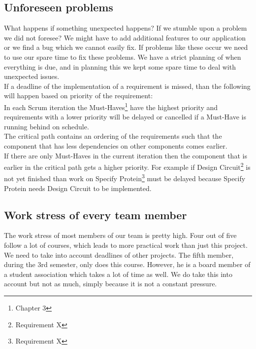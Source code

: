 \documentclass[a4paper]{article}
\begin{document}
\subsection{Unforeseen problems}
What happens if something unexpected happens? If we stumble upon a problem we did not foresee? We might have to add additional features to our application or we find a bug which we cannot easily fix. If problems like these occur we need to use our spare time to fix these problems. We have a strict planning of when everything is due, and in planning this we kept some spare time to deal with unexpected issues.\\
If a deadline of the implementation of a requirement is missed, than the following will happen based on priority of the requirement:\\
In each Scrum iteration the Must-Haves\footnote{Chapter 3} have the highest priority and requirements with a lower priority will be delayed or cancelled if a Must-Have is running behind on schedule.\\
The critical path contains an ordering of the requirements such that the component that has less dependencies on other components comes earlier.\\
If there are only Must-Haves in the current iteration then the component that is earlier in the critical path gets a higher priority. For example if Design Circuit\footnote{Requirement X} is not yet finished than work on Specify Protein\footnote{Requirement X} must be delayed because Specify Protein needs Design Circuit to be implemented.\\


\subsection{Work stress of every team member}
The work stress of most members of our team is pretty high. Four out of five follow a lot of courses, which leads to more practical work than just this project. We need to take into account deadlines of other projects. The fifth member, during the 3rd semester, only does this course. However, he is a board member of a student association which takes a lot of time as well. We do take this into account but not as much, simply because it is not a constant pressure.
\end{document}
